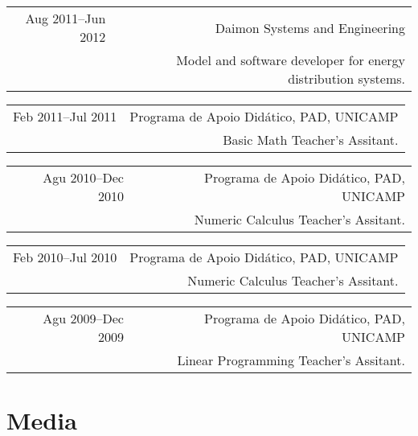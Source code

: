 \documentclass[a4paper,10pt]{article}
\begin{document}
\begin{tabularx}{\textwidth}{D|R}
Aug 2011--Jun 2012   & Daimon Systems and Engineering\\
                    & \footnotesize Model and software developer for energy distribution systems.\\
\end{tabularx}

\begin{tabularx}{\textwidth}{D|R}
Feb 2011--Jul 2011   & Programa de Apoio Didático, PAD, UNICAMP\\
                    & \footnotesize Basic Math Teacher’s Assitant.\\
\end{tabularx}

\begin{tabularx}{\textwidth}{D|R}
Agu 2010--Dec 2010   & Programa de Apoio Didático, PAD, UNICAMP\\
                    & \footnotesize Numeric Calculus Teacher’s Assitant.\\
\end{tabularx}

\begin{tabularx}{\textwidth}{D|R}
Feb 2010--Jul 2010   & Programa de Apoio Didático, PAD, UNICAMP\\
                    & \footnotesize Numeric Calculus Teacher’s Assitant.\\
\end{tabularx}

\begin{tabularx}{\textwidth}{D|R}
Agu 2009--Dec 2009   & Programa de Apoio Didático, PAD, UNICAMP\\
                    & \footnotesize Linear Programming Teacher’s Assitant.\\
\end{tabularx}


\nocite{*}
\printbibliography[title={Publications}]


\section{Media}
\end{document}
